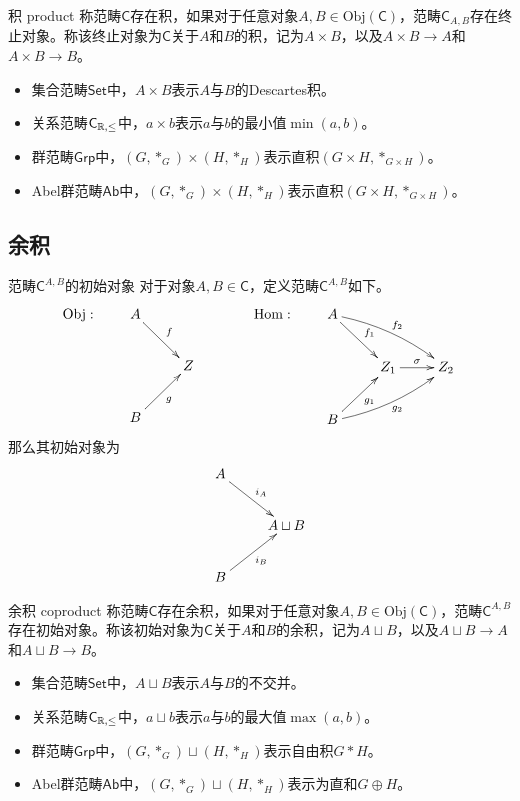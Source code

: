 \begin{definition}{积 product}
	称范畴$\mathsf{C}$存在积，如果对于任意对象$A,B\in\mathrm{Obj}(\mathsf{C})$，范畴$\mathsf{C}_{A,B}$存在终止对象。称该终止对象为$\mathsf{C}$关于$A$和$B$的积，记为$A\times B$，以及$A\times B\to A$和$A\times B\to B$。
\end{definition}

\begin{example}
	\begin{itemize}
		\item 集合范畴$\mathsf{Set}$中，$A\times B$表示$A$与$B$的Descartes积。
		\item 关系范畴$\mathsf{C}_{\mathbb{R},\le}$中，$a\times b$表示$a$与$b$的最小值$\min(a,b)$。
		\item 群范畴$\mathsf{Grp}$中，$(G,*_G)\times (H,*_H)$表示直积$(G\times H,*_{G\times H})$。
		\item Abel群范畴$\mathsf{Ab}$中，$(G,*_G)\times (H,*_H)$表示直积$(G\times H,*_{G\times H})$。
	\end{itemize}
\end{example}

\subsection{余积}

\begin{proposition}{范畴$\mathsf{C}^{A,B}$的初始对象}
	对于对象$A,B\in\mathsf{C}$，定义范畴$\mathsf{C}^{A,B}$​如下。
	$$
	\mathrm{Obj}:\qquad
	\xymatrix{
		A \ar[dr]^f&\\
		&Z  \\
		B \ar[ur]_g&
	}
	\qquad\qquad 
	\mathrm{Hom}:\qquad
	\xymatrix{
		A \ar[dr]^{f_1} \ar@/^/[drr]^{f_2} & & \\
		& Z_1 \ar[r]^\sigma & Z_2 \\
		B \ar[ur]_{g_1} \ar@/_/[urr]_{g_2} & & \\
	}
	$$
	那么其初始对象为
	$$
	\xymatrix{
		A \ar[dr]^{i_A}&\\
		&A\sqcup B  \\
		B \ar[ur]_{i_B}&
	}
	$$
\end{proposition}

\begin{definition}{余积 coproduct}
	称范畴$\mathsf{C}$存在余积，如果对于任意对象$A,B\in\mathrm{Obj}(\mathsf{C})$，范畴$\mathsf{C}^{A,B}$存在初始对象。称该初始对象为$\mathsf{C}$关于$A$和$B$的余积，记为$A\sqcup B$，以及$A\sqcup B\to A$和$A\sqcup B\to B$。
\end{definition}

\begin{example}
	\begin{itemize}
		\item 集合范畴$\mathsf{Set}$中，$A\sqcup  B$表示$A$与$B$的不交并。
		\item 关系范畴$\mathsf{C}_{\mathbb{R},\le}$中，$a\sqcup b$表示$a$与$b$的最大值$\max(a,b)$。
		\item 群范畴$\mathsf{Grp}$中，$(G,*_G)\sqcup (H,*_H)$表示自由积$G*H$。
		\item Abel群范畴$\mathsf{Ab}$中，$(G,*_G)\sqcup (H,*_H)$表示为直和$G\oplus H$。
	\end{itemize}
\end{example}

% 
